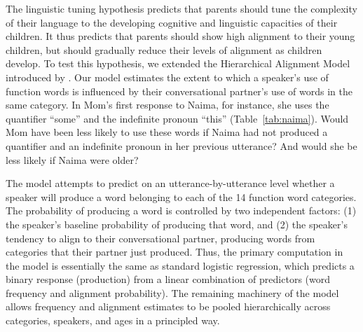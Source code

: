 \documentclass[10pt,letterpaper]{article}
\begin{document}
The linguistic tuning hypothesis predicts that parents should tune the complexity of their language to the developing cognitive and linguistic capacities of their children. It thus predicts that parents should show high alignment to their young children, but should gradually reduce their levels of alignment as children develop. To test this hypothesis, we extended the Hierarchical Alignment Model introduced by . Our model estimates the extent to which a speaker's use of function words is influenced by their conversational partner's use of words in the same category. In Mom's first response to Naima, for instance, she uses the quantifier ``some'' and the indefinite pronoun ``this'' (Table~\ref{tab:naima}). Would Mom have been less likely to use these words if Naima had not produced a quantifier and an indefinite pronoun in her previous utterance? And would she be less likely if Naima were older?

The model attempts to predict on an utterance-by-utterance level whether a speaker will produce a word belonging to each of the 14 function word categories. The probability of producing a word is controlled by two independent factors: (1) the speaker's baseline probability of producing that word, and (2) the speaker's tendency to align to their conversational partner, producing words from categories that their partner just produced. Thus, the primary computation in the model is essentially the same as standard logistic regression, which predicts a binary response (production) from a linear combination of predictors (word frequency and alignment probability). The remaining machinery of the model allows frequency and alignment estimates to be pooled hierarchically across categories, speakers, and ages in a principled way.
\end{document}
